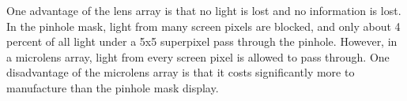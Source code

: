 One advantage of the lens array is that no light is lost and no information is lost. In the pinhole mask, light from many screen pixels are blocked, and only about 4 percent of all light under a 5x5 superpixel pass through the pinhole. However, in a microlens array, light from every screen pixel is allowed to pass through. One disadvantage of the microlens array is that it costs significantly more to manufacture than the pinhole mask display.

